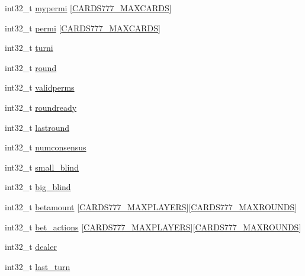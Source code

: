 \begin{DoxyCompactItemize}
int32\+\_\+t \hyperlink{structprivatebet__vars_acd3817a80f1de7845e27291c550b0e92}{mypermi} \mbox{[}\hyperlink{common_8h_a90f0ea2d767ac1915e44acb24a1fe1bd}{C\+A\+R\+D\+S777\+\_\+\+M\+A\+X\+C\+A\+R\+DS}\mbox{]}
\item 
int32\+\_\+t \hyperlink{structprivatebet__vars_ab84d5fd502ed68296043e4b42a19398f}{permi} \mbox{[}\hyperlink{common_8h_a90f0ea2d767ac1915e44acb24a1fe1bd}{C\+A\+R\+D\+S777\+\_\+\+M\+A\+X\+C\+A\+R\+DS}\mbox{]}
\item 
int32\+\_\+t \hyperlink{structprivatebet__vars_a9bda4d6f988f69e54218f62c3bcd1233}{turni}
\item 
int32\+\_\+t \hyperlink{structprivatebet__vars_a184f9ce3af1e6e3b08aa2e6d9b0cdbf1}{round}
\item 
int32\+\_\+t \hyperlink{structprivatebet__vars_a73fcbc896674210a5223a4882ac4155b}{validperms}
\item 
int32\+\_\+t \hyperlink{structprivatebet__vars_ad73f44b3265d431c0c24ae28c4e13f72}{roundready}
\item 
int32\+\_\+t \hyperlink{structprivatebet__vars_a790a7f2f8be1750bdf9cb427757e05cb}{lastround}
\item 
int32\+\_\+t \hyperlink{structprivatebet__vars_ae78c3f094c017e1eceb76b38a9191f12}{numconsensus}
\item 
int32\+\_\+t \hyperlink{structprivatebet__vars_a6ceca0aa346ee52a267954a93a0310d5}{small\+\_\+blind}
\item 
int32\+\_\+t \hyperlink{structprivatebet__vars_ae12d2ae74edbf729a736f7ab11479757}{big\+\_\+blind}
\item 
int32\+\_\+t \hyperlink{structprivatebet__vars_ad76c9dddaf0a04d2ebb1e9ee95d3c8af}{betamount} \mbox{[}\hyperlink{common_8h_a97d6188fd175f4ea7268e9445107a7c0}{C\+A\+R\+D\+S777\+\_\+\+M\+A\+X\+P\+L\+A\+Y\+E\+RS}\mbox{]}\mbox{[}\hyperlink{common_8h_aa7cb3dc82286cdcfc50250b3ec3ae769}{C\+A\+R\+D\+S777\+\_\+\+M\+A\+X\+R\+O\+U\+N\+DS}\mbox{]}
\item 
int32\+\_\+t \hyperlink{structprivatebet__vars_a381939fb9b7f85c0b09f3af728eb5b42}{bet\+\_\+actions} \mbox{[}\hyperlink{common_8h_a97d6188fd175f4ea7268e9445107a7c0}{C\+A\+R\+D\+S777\+\_\+\+M\+A\+X\+P\+L\+A\+Y\+E\+RS}\mbox{]}\mbox{[}\hyperlink{common_8h_aa7cb3dc82286cdcfc50250b3ec3ae769}{C\+A\+R\+D\+S777\+\_\+\+M\+A\+X\+R\+O\+U\+N\+DS}\mbox{]}
\item 
int32\+\_\+t \hyperlink{structprivatebet__vars_a9fabccec02611d3882520e04ebf0827e}{dealer}
\item 
int32\+\_\+t \hyperlink{structprivatebet__vars_a010311c27ac57ee8379a1c378ccc2dbf}{last\+\_\+turn}

\end{DoxyCompactItemize}
